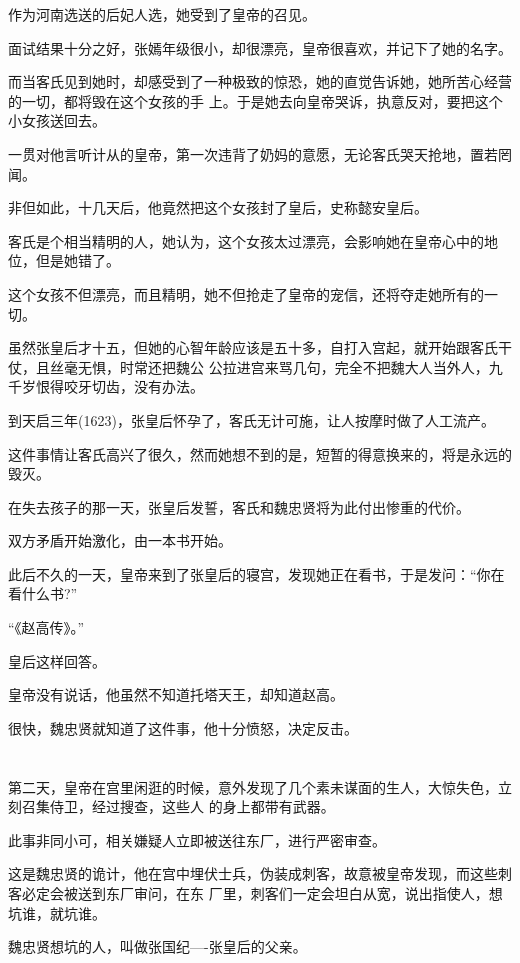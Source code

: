 \documentclass[11pt,a4paper,onecolumn]{article}
\begin{document}
作为河南选送的后妃人选，她受到了皇帝的召见。

面试结果十分之好，张嫣年级很小，却很漂亮，皇帝很喜欢，并记下了她的名字。

而当客氏见到她时，却感受到了一种极致的惊恐，她的直觉告诉她，她所苦心经营的一切，都将毁在这个女孩的手
上。于是她去向皇帝哭诉，执意反对，要把这个小女孩送回去。

一贯对他言听计从的皇帝，第一次违背了奶妈的意愿，无论客氏哭天抢地，置若罔闻。

非但如此，十几天后，他竟然把这个女孩封了皇后，史称懿安皇后。

客氏是个相当精明的人，她认为，这个女孩太过漂亮，会影响她在皇帝心中的地位，但是她错了。

这个女孩不但漂亮，而且精明，她不但抢走了皇帝的宠信，还将夺走她所有的一切。

虽然张皇后才十五，但她的心智年龄应该是五十多，自打入宫起，就开始跟客氏干仗，且丝毫无惧，时常还把魏公
公拉进宫来骂几句，完全不把魏大人当外人，九千岁恨得咬牙切齿，没有办法。

到天启三年(1623)，张皇后怀孕了，客氏无计可施，让人按摩时做了人工流产。

这件事情让客氏高兴了很久，然而她想不到的是，短暂的得意换来的，将是永远的毁灭。

在失去孩子的那一天，张皇后发誓，客氏和魏忠贤将为此付出惨重的代价。

双方矛盾开始激化，由一本书开始。

此后不久的一天，皇帝来到了张皇后的寝宫，发现她正在看书，于是发问：``你在看什么书?''

``《赵高传》。''

皇后这样回答。

皇帝没有说话，他虽然不知道托塔天王，却知道赵高。

很快，魏忠贤就知道了这件事，他十分愤怒，决定反击。

\section[\thesection]{}

第二天，皇帝在宫里闲逛的时候，意外发现了几个素未谋面的生人，大惊失色，立刻召集侍卫，经过搜查，这些人
的身上都带有武器。

此事非同小可，相关嫌疑人立即被送往东厂，进行严密审查。

这是魏忠贤的诡计，他在宫中埋伏士兵，伪装成刺客，故意被皇帝发现，而这些刺客必定会被送到东厂审问，在东
厂里，刺客们一定会坦白从宽，说出指使人，想坑谁，就坑谁。

魏忠贤想坑的人，叫做张国纪----张皇后的父亲。
\end{document}
